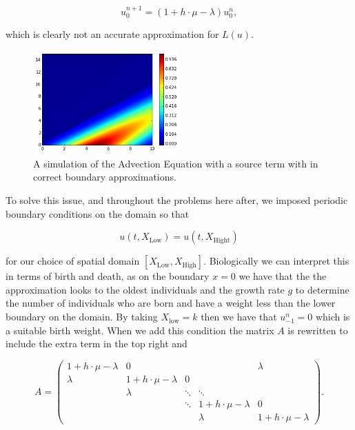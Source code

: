 \documentclass[../main]{subfiles}
\begin{document}
  \begin{equation}
    u^{n+1}_0 = \left( 1 + h \cdot \mu - \lambda \right) u^n_0,
  \end{equation}

  which is clearly not an accurate approximation for $L(u)$.

  \begin{figure}
    \centering
    \includegraphics[width=0.5\textwidth]{_assets/advection_noPeriod.png}
    \caption{\label{diff:fig:advectionPlotNoPeriod} A simulation of the Advection Equation with a source term with in correct boundary approximations.}
  \end{figure}

  To solve this issue, and throughout the problems here after, we imposed periodic boundary conditions on the domain so that

  \begin{equation}
    u(t, X_{\mathrm{Low}}) = u(t, X_{\mathrm{Hight}})
  \end{equation}

  for our choice of spatial domain $[X_{\mathrm{Low}}, X_{\mathrm{High}}]$. Biologically we can interpret this in terms of birth and death, as on the boundary $x = 0$ we have that the the approximation looks to the oldest individuals and the growth rate $g$ to determine the number of individuals who are born and have a weight less than the lower boundary on the domain. By taking $X_{\mathrm{low}} = k$ then we have that $u^n_{-1} = 0$ which is a suitable birth weight. When we add this condition the matrix $A$ is rewritten to include the extra term in the top right and

  \begin{equation}
    A = \begin{pmatrix}
      1 + h \cdot \mu - \lambda   & 0                         &         &                           & \lambda \\
      \lambda                     & 1 + h \cdot \mu - \lambda & 0       &\\
                                  & \lambda                   & \ddots  & \ddots                    & \\
                                  &                           & \ddots  & 1 + h \cdot \mu - \lambda & 0 \\
                                  &                           &         & \lambda                   & 1 + h \cdot \mu - \lambda
    \end{pmatrix}.
  \end{equation}
\end{document}
